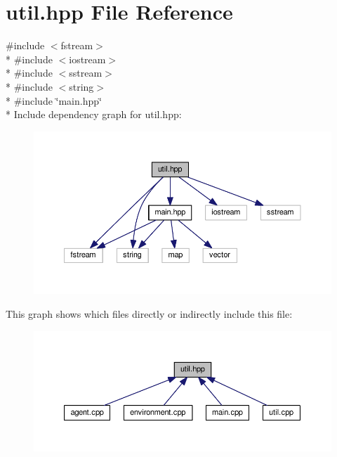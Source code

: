\section{util.\+hpp File Reference}
\label{util_8hpp}
{\ttfamily \#include $<$fstream$>$}\\*
{\ttfamily \#include $<$iostream$>$}\\*
{\ttfamily \#include $<$sstream$>$}\\*
{\ttfamily \#include $<$string$>$}\\*
{\ttfamily \#include \char`\"{}main.\+hpp\char`\"{}}\\*
Include dependency graph for util.\+hpp\+:
\nopagebreak
\begin{figure}[H]
\begin{center}
\leavevmode
\includegraphics[width=350pt]{util_8hpp__incl}
\end{center}
\end{figure}
This graph shows which files directly or indirectly include this file\+:
\nopagebreak
\begin{figure}[H]
\begin{center}
\leavevmode
\includegraphics[width=350pt]{util_8hpp__dep__incl}
\end{center}
\end{figure}
